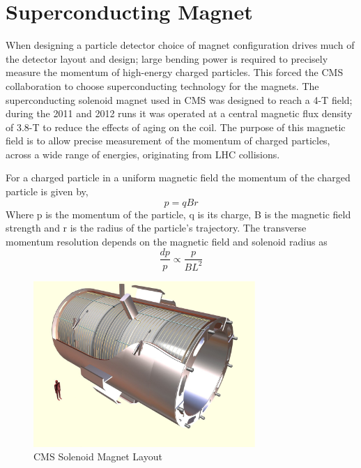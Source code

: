 \section{Superconducting Magnet}
When designing a particle detector choice of magnet configuration drives
much of the detector layout and design; large bending power is required to precisely 
measure the momentum of high-energy charged particles. This forced the CMS
collaboration to choose superconducting technology for the magnets.
The superconducting solenoid magnet used in CMS was designed to reach a 4-T field;
during the 2011 and 2012 runs it was operated at a central magnetic flux
density of 3.8-T to reduce the effects of aging on the coil. %
The purpose of this magnetic field is to allow precise measurement of the 
momentum of charged particles, across a wide range of energies, originating from LHC collisions. 

For a charged particle in a uniform magnetic field the  momentum of the charged particle is given by,
\begin{displaymath}
p=qBr
\end{displaymath}  
Where p is the momentum of the particle, q is its charge, B is the 
magnetic field strength and r is the radius of the particle's trajectory.
The transverse momentum resolution depends on the magnetic field and
solenoid radius as
\begin{displaymath}
\frac{dp}{p}\propto\frac{p}{BL^{2}}
\end{displaymath}
\begin{figure}[hb]
  \centering
	\includegraphics[width=0.75\textwidth]{ECALimages/magnet.png}
  	\caption[CMS Solenoid Magnet Layout]
   	{CMS Solenoid Magnet Layout}
	\label{fig:magnetLayout}
\end{figure}

